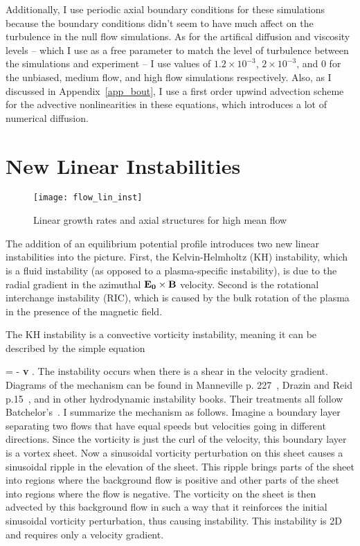Additionally, I use periodic axial boundary conditions for these simulations because the boundary conditions didn't seem to have much affect on the turbulence in the null flow simulations.
As for the artifical diffusion and viscosity levels -- which I use as a free parameter to match the level of turbulence between the simulations and experiment -- I use values of
$1.2 \times 10^{-3}$, $2 \times 10^{-3}$, and $0$ for the unbiased, medium flow, and high flow simulations respectively. Also, as I discussed in Appendix~\ref{app_bout}, I use a first order
upwind advection scheme for the advective nonlinearities in these equations, which introduces a lot of numerical diffusion.


\section{New Linear Instabilities}
\label{s_flow_inst}

\begin{figure}[!ht]
\centerline{\texttt{[image: flow\_lin\_inst]}}
\caption{Linear growth rates and axial structures for high mean flow}
\label{flow_lin_inst}
\end{figure}


The addition of an equilibrium potential profile introduces two new linear instabilities into the picture. First, the Kelvin-Helmholtz (KH) instability, which is a fluid instability (as opposed to
a plasma-specific instability), is due to the radial gradient in the azimuthal ${\bf E_0 \times B}$ velocity. Second is the rotational interchange instability (RIC), which is caused by the bulk
rotation of the plasma in the presence of the magnetic field.

The KH instability is a convective vorticity instability, meaning it can be described by the simple equation

\beq
\label{kh_inst_eq}
 = - {\bf v} \cdot \grad \varpi.
\eeq
The instability occurs when there is a shear in the velocity gradient. Diagrams of the mechanism can be found in Manneville p. 227~\cite{manneville2004}, Drazin and Reid p.15~\cite{drazin1981},
and in other hydrodynamic instability books. Their treatments all follow Batchelor's~\cite{batchelor1967}. I summarize the mechanism as follows.
Imagine a boundary layer separating two flows that have equal speeds but velocities going in different directions. Since
the vorticity is just the curl of the velocity, this boundary layer is a vortex sheet. Now a sinusoidal vorticity perturbation on this sheet causes a sinusoidal ripple in the elevation
of the sheet. This ripple brings parts of the sheet into regions where the background flow is positive and other parts of the sheet into regions where the flow is negative. The vorticity on
the sheet is then advected by this background flow in such a way that it reinforces the initial sinusoidal vorticity perturbation, thus causing instability. This instability is 2D and requires
only a velocity gradient.

